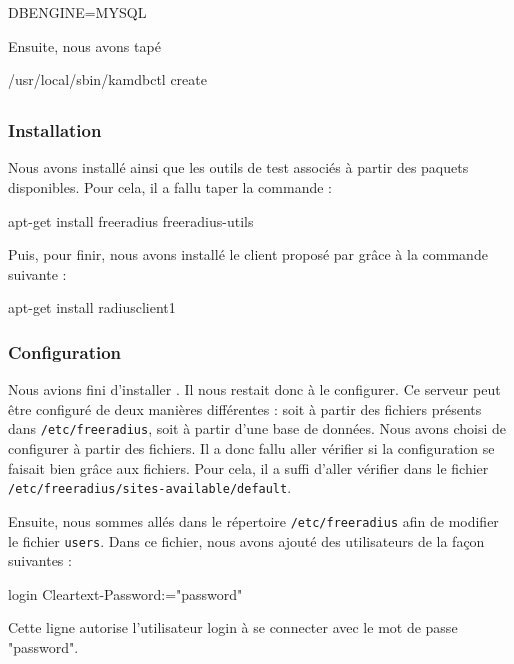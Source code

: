 \begin{kamcf}
DBENGINE=MYSQL
\end{kamcf}

Ensuite, nous avons tapé 
\begin{shellcode}
/usr/local/sbin/kamdbctl create
\end{shellcode}
\todo

\subsection{\frad}
\subsubsection{Installation}

Nous avons installé {\frad} ainsi que les outils de test associés à partir des paquets disponibles. Pour cela, il a fallu taper la commande :

\begin{shellcode}
apt-get install freeradius freeradius-utils
\end{shellcode}

Puis, pour finir, nous avons installé le client {\rad} proposé par {\frad} grâce à la commande suivante :

\begin{shellcode}
apt-get install radiusclient1
\end{shellcode}

\subsubsection{Configuration}
Nous avions fini d'installer {\frad}. Il nous restait donc à le configurer. Ce serveur {\rad} peut être configuré de deux manières différentes : soit à partir des fichiers présents dans \texttt{/etc/freeradius}, soit à partir d'une base de données. Nous avons choisi de configurer à partir des fichiers. Il a donc fallu aller vérifier si la configuration se faisait bien grâce aux fichiers. Pour cela, il a suffi d'aller vérifier dans le fichier \texttt{/etc/freeradius/sites-available/default}.

Ensuite, nous sommes allés dans le répertoire \texttt{/etc/freeradius} afin de modifier le fichier \texttt{users}. Dans ce fichier, nous avons ajouté des utilisateurs de la façon suivantes :

login Cleartext-Password:="password"

Cette ligne autorise l'utilisateur login à se connecter avec le mot de passe "password".

